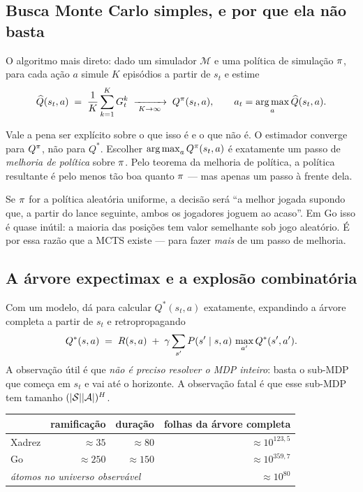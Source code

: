 \documentclass[11pt]{article}
\begin{document}
\subsection{Busca Monte Carlo simples, e por que ela não basta}

O algoritmo mais direto: dado um simulador $\mathcal{M}$ e uma política de
simulação $\pi$, para cada ação $a$ simule $K$ episódios a partir de $s_t$ e
estime
\[
  \widehat{Q}(s_t,a) \;=\; \frac{1}{K}\sum_{k=1}^{K} G_t^{k}
  \;\xrightarrow[\;K\to\infty\;]{}\; Q^{\pi}(s_t,a),
  \qquad
  a_t = \operatorname*{arg\,max}_{a} \widehat{Q}(s_t,a).
\]

Vale a pena ser explícito sobre o que isso é e o que não é. O estimador converge
para $Q^{\pi}$, não para $Q^{*}$. Escolher $\operatorname*{arg\,max}_a Q^{\pi}(s_t,a)$ é
exatamente um passo de \emph{melhoria de política} sobre $\pi$. Pelo teorema da
melhoria de política, a política resultante é pelo menos tão boa quanto $\pi$ —
mas apenas um passo à frente dela.

\begin{alertabox}
Se $\pi$ for a política aleatória uniforme, a decisão será ``a melhor jogada
supondo que, a partir do lance seguinte, ambos os jogadores joguem ao acaso''. Em
Go isso é quase inútil: a maioria das posições tem valor semelhante sob jogo
aleatório. É por essa razão que a MCTS existe — para fazer \emph{mais} de um
passo de melhoria.
\end{alertabox}

\subsection{A árvore expectimax e a explosão combinatória}

Com um modelo, dá para calcular $Q^{*}(s_t,a)$ exatamente, expandindo a árvore
completa a partir de $s_t$ e retropropagando
\[
  Q^{*}(s,a) \;=\; R(s,a) \;+\; \gamma \sum_{s'} P(s'\mid s,a)\,\max_{a'} Q^{*}(s',a').
\]
A observação útil é que \emph{não é preciso resolver o MDP inteiro}: basta o
sub-MDP que começa em $s_t$ e vai até o horizonte. A observação fatal é que esse
sub-MDP tem tamanho $(\lvert\mathcal{S}\rvert\lvert\mathcal{A}\rvert)^{H}$.

\begin{center}
\begin{tabular}{lrrr}
\toprule
 & \textbf{ramificação} & \textbf{duração} & \textbf{folhas da árvore completa} \\
\midrule
Xadrez & $\approx 35$  & $\approx 80$  & $\approx 10^{123{,}5}$ \\
Go     & $\approx 250$ & $\approx 150$ & $\approx 10^{359{,}7}$ \\
\midrule
\multicolumn{3}{l}{\itshape átomos no universo observável} & $\approx 10^{80}$ \\
\bottomrule
\end{tabular}
\end{center}
\end{document}
